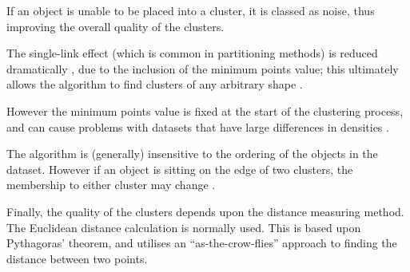 If an object is unable to be placed into a cluster, it is classed as noise, thus 
improving the overall quality of the clusters.

The single-link effect (which is common in partitioning methods) is reduced 
dramatically \citep{tan05}, due to the inclusion of the minimum points value; 
this ultimately allows the algorithm to find clusters of any arbitrary shape
\citep{han06}. 

However the minimum points value is fixed at the start of the clustering 
process, and can cause problems with datasets that have large differences in 
densities \citep{han06}.

The algorithm is (generally) insensitive to the ordering of the objects in the
dataset. However if an object is sitting on the edge of two clusters, the 
membership to either cluster may change \citep{han06,tan05}.

Finally, the quality of the clusters depends upon the distance measuring 
method. The Euclidean distance calculation is normally used. This is based upon
Pythagoras' theorem, and utilises an ``as-the-crow-flies'' approach to finding
the distance between two points.
